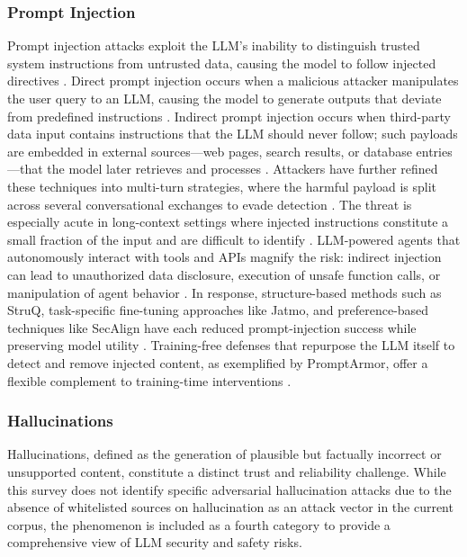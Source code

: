 \documentclass[11pt,a4paper]{article}
\begin{document}
\subsubsection{Prompt Injection}
Prompt injection attacks exploit the LLM's inability to distinguish trusted system instructions from untrusted data, causing the model to follow injected directives \cite{Wu_2025_LLM_7fee400f}. Direct prompt injection occurs when a malicious attacker manipulates the user query to an LLM, causing the model to generate outputs that deviate from predefined instructions \cite{Wu_2025_LLM_7fee400f}. Indirect prompt injection occurs when third-party data input contains instructions that the LLM should never follow; such payloads are embedded in external sources---web pages, search results, or database entries---that the model later retrieves and processes \cite{Wu_2025_LLM_7fee400f, Yao_2025_LLM_a1c8adc0}. Attackers have further refined these techniques into multi-turn strategies, where the harmful payload is split across several conversational exchanges to evade detection \cite{Shih_2025_AI_0f3eb425}. The threat is especially acute in long-context settings where injected instructions constitute a small fraction of the input and are difficult to identify \cite{Geng_2025_LLMs_16cfd21e}. LLM-powered agents that autonomously interact with tools and APIs magnify the risk: indirect injection can lead to unauthorized data disclosure, execution of unsafe function calls, or manipulation of agent behavior \cite{Chang_2025_LLM_1f6233a6}. In response, structure-based methods such as StruQ, task-specific fine-tuning approaches like Jatmo, and preference-based techniques like SecAlign have each reduced prompt-injection success while preserving model utility \cite{Chen_2024_StruQ, Piet_2023_Jatmo, Chen_2024_SecAlign}. Training-free defenses that repurpose the LLM itself to detect and remove injected content, as exemplified by PromptArmor, offer a flexible complement to training-time interventions \cite{Shi_2025_Promptarmor_d535ddee}.

\subsubsection{Hallucinations}
Hallucinations, defined as the generation of plausible but factually incorrect or unsupported content, constitute a distinct trust and reliability challenge. While this survey does not identify specific adversarial hallucination attacks due to the absence of whitelisted sources on hallucination as an attack vector in the current corpus, the phenomenon is included as a fourth category to provide a comprehensive view of LLM security and safety risks.
\end{document}
